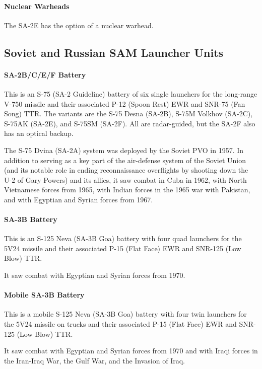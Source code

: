 \paragraph{Nuclear Warheads}
The SA-2E has the option of a nuclear warhead.

\subsection{Soviet and Russian SAM Launcher Units}

\paragraph{SA-2B/C/E/F Battery}

This is an S-75 (SA-2 Guideline) battery of six single launchers for the long-range V-750 missile and their associated P-12 (Spoon Rest) EWR and SNR-75 (Fan Song) TTR. The variants are the S-75 Desna (SA-2B), S-75M Volkhov (SA-2C), S-75AK (SA-2E), and S-75SM (SA-2F).
All are radar-guided, but the SA-2F also has an optical backup.

The S-75 Dvina (SA-2A) system was deployed by the Soviet PVO in 1957. In addition to serving as a key part of the air-defense system of the Soviet Union (and its notable role in ending reconnaissance overflights by shooting down the U-2 of Gary Powers) and its allies, it saw combat in Cuba in 1962, with North Vietnamese forces from 1965, with Indian forces in the 1965 war with Pakistan, and with Egyptian and Syrian forces from 1967.

\paragraph{SA-3B Battery}

This is an S-125 Neva (SA-3B Goa) battery with four quad launchers for the 5V24 missile and their associated P-15 (Flat Face) EWR and SNR-125 (Low Blow) TTR.

It saw combat with Egyptian and Syrian forces from 1970.

\paragraph{Mobile SA-3B Battery}

This is a mobile S-125 Neva (SA-3B Goa) battery with four twin launchers for the 5V24 missile on trucks and their associated P-15 (Flat Face) EWR and SNR-125 (Low Blow) TTR.

It saw combat with Egyptian and Syrian forces from 1970 and with Iraqi forces in the Iran-Iraq War, the Gulf War, and the Invasion of Iraq.

